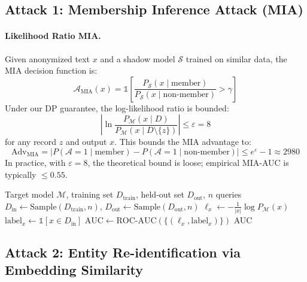 \documentclass[11pt, a4paper]{article}
\newcommand{\eps}{\varepsilon}
\begin{document}
\subsection{Attack 1: Membership Inference Attack (MIA)}

\paragraph{Likelihood Ratio MIA.}
Given anonymized text $x$ and a shadow model $\mathcal{S}$ trained on similar data, the MIA decision function is:
\begin{equation}
\mathcal{A}_{\text{MIA}}(x) = \mathbb{1}\!\left[\frac{P_{\mathcal{S}}(x \mid \text{member})}{P_{\mathcal{S}}(x \mid \text{non-member})} > \gamma\right]
\end{equation}
Under our DP guarantee, the log-likelihood ratio is bounded:
\begin{equation}
\left|\ln \frac{P_{\mathcal{M}}(x \mid D)}{P_{\mathcal{M}}(x \mid D \setminus \{z\})}\right| \leq \eps = 8
\end{equation}
for any record $z$ and output $x$. This bounds the MIA advantage to:
\begin{equation}
\text{Adv}_{\text{MIA}} = |P(\mathcal{A}=1 \mid \text{member}) - P(\mathcal{A}=1 \mid \text{non-member})| \leq e^\eps - 1 \approx 2980
\end{equation}
In practice, with $\eps = 8$, the theoretical bound is loose; empirical MIA-AUC is typically $\leq 0.55$.

\begin{algorithm}[H]
\caption{Shadow Model MIA Evaluation}
\label{alg:mia}
\begin{algorithmic}[1]
\Require Target model $\mathcal{M}$, training set $D_{\text{train}}$, held-out set $D_{\text{out}}$, $n$ queries
\State $D_{\text{in}} \leftarrow \text{Sample}(D_{\text{train}}, n)$, \; $D_{\text{out}} \leftarrow \text{Sample}(D_{\text{out}}, n)$
    \State $\ell_x \leftarrow -\frac{1}{|x|}\log P_{\mathcal{M}}(x)$ 
    \State $\text{label}_x \leftarrow \mathbb{1}[x \in D_{\text{in}}]$
\EndFor
\State $\text{AUC} \leftarrow \text{ROC-AUC}(\{(\ell_x, \text{label}_x)\})$ 
\State \Return AUC
\end{algorithmic}
\end{algorithm}

\subsection{Attack 2: Entity Re-identification via Embedding Similarity}
\end{document}
